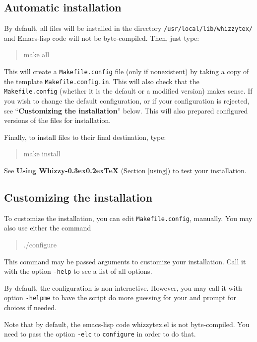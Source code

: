 \documentclass[12pt]{article}
\makeatletter
\let \lst \verb
\def \whizzy {{Whizzy\kern -0.3ex\raise 0.2ex\hbox{\let \@\relax\TeX}}}
\makeatother
\begin{document}
\subsection {Automatic installation}

\label {install/automatic}

By default, all files will be installed in the directory
\lst"/usr/local/lib/whizzytex/" and Emacs-lisp code will not be 
byte-compiled. Then, just type: 
\begin{quote}
\begin{tt}
make all
\end{tt}
\end{quote}
This will create a \lst"Makefile.config" file (only if nonexistent) by
taking a copy of the template \lst"Makefile.config.in". This will also check
that the \lst"Makefile.config" (whether it is the default or a modified
version) makes sense. If you wish to change the default configuration, or if
your configuration is rejected, see ``{\bf Customizing the installation}''
below. This will also prepared configured versions of the
files for installation.

Finally, to install files to their final destination, type:
\begin{quote}
\begin{tt}
make install
\end{tt}
\end{quote}
See {\bf Using {\whizzy}} (Section \ref {using}) to test your installation.

\subsection {Customizing the installation}

To customize the installation, you can edit 
\lst"Makefile.config", manually.
You may also use either the command
\begin{quote}
\begin{tt}
./configure
\end{tt}
\end{quote}
This command may be passed arguments to customize your installation.
Call it with the option \lst"-help" to see a list of all options.

By default, the configuration is non interactive.  However, you may call it
with option \lst"-helpme" to have the script do more guessing for your and
prompt for choices if needed.

Note that by default, the emacs-lisp code whizzytex.el is not
byte-compiled. You need to pass the option \lst"-elc" to \lst"configure" 
in order to do that.
\end{document}
